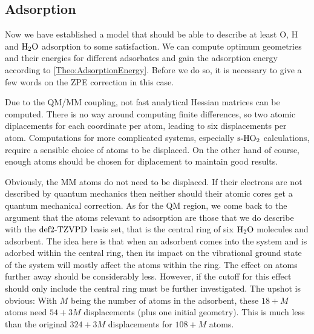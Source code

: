 \documentclass[8.5pt,twoside,twocolumn]{article}
\newcommand\zpe{\enmat{\te{ZPE}}}
\newcommand\sur{\enmat{\te{s-}}}
\theoremstyle{standard}
\begin{document}

\subsection{Adsorption}
\label{Sec:Ads:Adsorption}
\newcommand\zpering{\enmat{\zpe/\te{ring}}}
\newcommand\zpeall{\enmat{\zpe/\te{all}}}
Now we have established a model that should be able to describe at least O, 
H and $\text H _2 \text O$ adsorption to some satisfaction. We can compute optimum geometries
and their energies for different adsorbates and gain the adsorption energy
according to \eqref{Theo:AdsorptionEnergy}. Before we do so, it is necessary
to give a few words on the ZPE correction in this case.

Due to the QM/MM coupling, not fast analytical Hessian matrices can be computed.
There is no way around computing finite differences, so two atomic
diplacements for each coordinate per atom, leading to six displacements
per atom. Computations for more complicated systems, especially $\sur\hot$ calculations,
require a sensible choice of atoms to be displaced. On the other hand of course,
enough atoms should be chosen for diplacement to maintain good results.

Obviously, the MM atoms do not need to be displaced. If their electrons are not
described by quantum mechanics then neither should their atomic cores get a
quantum mechanical correction. As for the QM region, we come back to the argument that
the atoms relevant to adsorption are those that we do describe with the $\text{def2-TZVPD}$
basis set, that is the central ring of six $\text H _2 \text O$ molecules and adsorbent. The idea
here is that when an adsorbent comes into the system and is adorbed within the
central ring, then its impact on the vibrational ground state of the system
will mostly affect the atoms within the ring. The effect on atoms further
away should be considerably less. However, if the cutoff for this effect
should only include the central ring must be further investigated. The
upshot is obvious: With $M$ being the number of atoms in the adsorbent, these $18+M$ atoms
need $54+3M$ displacements (plus one initial geometry). This is much less than the
original $324+3M$ displacements for $108+M$ atoms.
\end{document}
